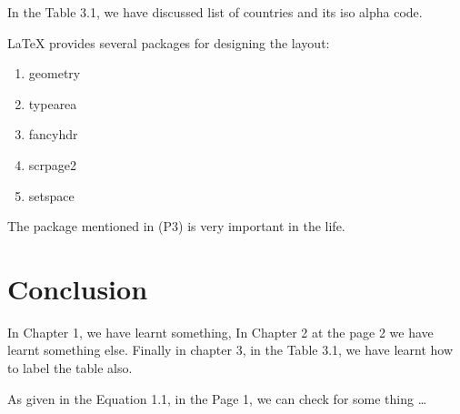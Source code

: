 \documentclass[oneside, 10pt]{book}
\begin{document}
In the Table 3.1, we have discussed list of countries and its iso alpha code. 

LaTeX provides several packages for designing the layout:
\begin{enumerate}[label={(P\arabic*)}]
	\item geometry
	\item typearea
	\item fancyhdr
	\item scrpage2
	\item setspace
\end{enumerate}

The package mentioned in (P3) is very important in the life. 
\chapter{Conclusion}

In Chapter 1, we have learnt something, In Chapter 2 at the page 2 we have learnt something else. Finally in chapter 3, in the Table 3.1, we have learnt how to label the table also. 

As given in the Equation 1.1, in the Page 1, we can check for some thing \dots
\end{document}
